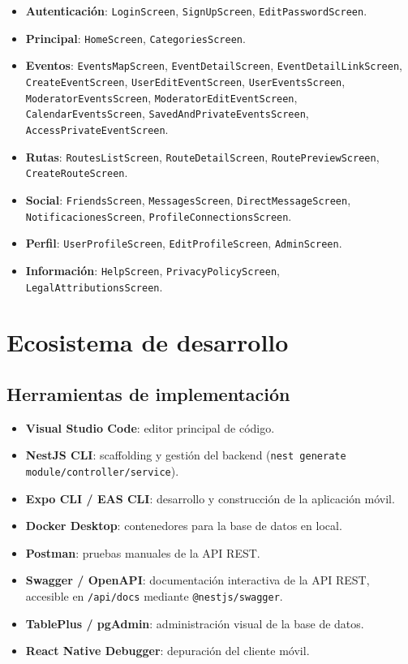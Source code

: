 \begin{itemize}
    \item \textbf{Autenticación}: \texttt{LoginScreen}, \texttt{SignUpScreen}, \texttt{EditPasswordScreen}.
    \item \textbf{Principal}: \texttt{HomeScreen}, \texttt{CategoriesScreen}.
    \item \textbf{Eventos}: \texttt{EventsMapScreen}, \texttt{EventDetailScreen}, \texttt{EventDetailLinkScreen}, \texttt{CreateEventScreen}, \texttt{UserEditEventScreen}, \texttt{UserEventsScreen}, \texttt{ModeratorEventsScreen}, \texttt{ModeratorEditEventScreen}, \texttt{CalendarEventsScreen}, \texttt{SavedAndPrivateEventsScreen}, \texttt{AccessPrivateEventScreen}.
    \item \textbf{Rutas}: \texttt{RoutesListScreen}, \texttt{RouteDetailScreen}, \texttt{RoutePreviewScreen}, \texttt{CreateRouteScreen}.
    \item \textbf{Social}: \texttt{FriendsScreen}, \texttt{MessagesScreen}, \texttt{DirectMessageScreen}, \texttt{NotificacionesScreen}, \texttt{ProfileConnectionsScreen}.
    \item \textbf{Perfil}: \texttt{UserProfileScreen}, \texttt{EditProfileScreen}, \texttt{AdminScreen}.
    \item \textbf{Información}: \texttt{HelpScreen}, \texttt{PrivacyPolicyScreen}, \texttt{LegalAttributionsScreen}.
\end{itemize}

\section{Ecosistema de desarrollo}

\subsection{Herramientas de implementación}

\begin{itemize}
    \item \textbf{Visual Studio Code}: editor principal de código.
    \item \textbf{NestJS CLI}: scaffolding y gestión del backend (\texttt{nest generate module/controller/service}).
    \item \textbf{Expo CLI / EAS CLI}: desarrollo y construcción de la aplicación móvil.
    \item \textbf{Docker Desktop}: contenedores para la base de datos en local.
    \item \textbf{Postman}: pruebas manuales de la API REST.
    \item \textbf{Swagger / OpenAPI}: documentación interactiva de la API REST, accesible en \texttt{/api/docs} mediante \texttt{@nestjs/swagger}.
    \item \textbf{TablePlus / pgAdmin}: administración visual de la base de datos.
    \item \textbf{React Native Debugger}: depuración del cliente móvil.
\end{itemize}

